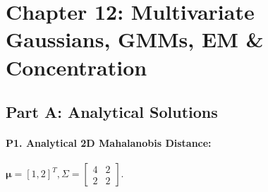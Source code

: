 \section*{Chapter 12: Multivariate Gaussians, GMMs, EM \& Concentration}

\subsection*{Part A: Analytical Solutions}

\paragraph{P1. Analytical 2D Mahalanobis Distance:}
$\boldsymbol{\mu} = [1, 2]^T, \Sigma = \begin{bmatrix} 4 & 2 \\ 2 & 2 \end{bmatrix}$.
